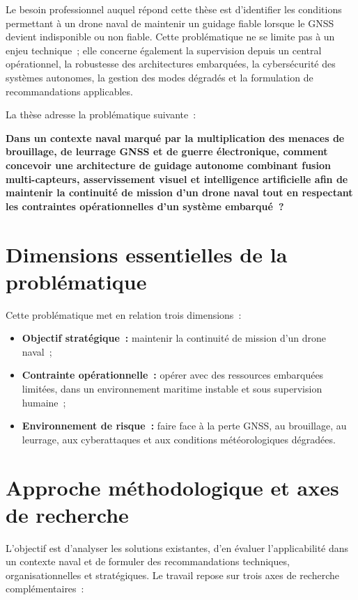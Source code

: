 \documentclass[12pt, a4paper, twoside, openright]{report}
\begin{document}
Le besoin professionnel auquel répond cette thèse est d'identifier les conditions permettant à un drone naval de maintenir un guidage fiable lorsque le GNSS devient indisponible ou non fiable. Cette problématique ne se limite pas à un enjeu technique~; elle concerne également la supervision depuis un central opérationnel, la robustesse des architectures embarquées, la cybersécurité des systèmes autonomes, la gestion des modes dégradés et la formulation de recommandations applicables.

La thèse adresse la problématique suivante~:

\begin{mdframed}[backgroundcolor=gray!10, linewidth=2pt]
\textbf{Dans un contexte naval marqué par la multiplication des menaces de brouillage, de leurrage GNSS et de guerre électronique, comment concevoir une architecture de guidage autonome combinant fusion multi-capteurs, asservissement visuel et intelligence artificielle afin de maintenir la continuité de mission d'un drone naval tout en respectant les contraintes opérationnelles d'un système embarqué~?}
\end{mdframed}

\section{Dimensions essentielles de la problématique}

Cette problématique met en relation trois dimensions~:

\begin{itemize}
    \item \textbf{Objectif stratégique~:} maintenir la continuité de mission d'un drone naval~;
    \item \textbf{Contrainte opérationnelle~:} opérer avec des ressources embarquées limitées, dans un environnement maritime instable et sous supervision humaine~;
    \item \textbf{Environnement de risque~:} faire face à la perte GNSS, au brouillage, au leurrage, aux cyberattaques et aux conditions météorologiques dégradées.
\end{itemize}

\section{Approche méthodologique et axes de recherche}

L'objectif est d'analyser les solutions existantes, d'en évaluer l'applicabilité dans un contexte naval et de formuler des recommandations techniques, organisationnelles et stratégiques. Le travail repose sur trois axes de recherche complémentaires~:
\end{document}
